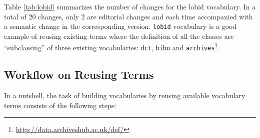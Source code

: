 Table \ref{tab:lobid} summarizes the number of changes for the lobid vocabulary. In  a total of 20 changes, only 2 are editorial changes and each time accompanied with a semantic change in the corresponding version.
\texttt{lobid} vocabulary is a good example of reusing existing terms where the definition of all the classes are ``subclassing'' of three existing vocabularies: \texttt{dct}, \texttt{bibo} and \texttt{archives}\footnote{\url{http://data.archiveshub.ac.uk/def/}}.  

\begin{table}[!htb]
\end{table}

\subsection{Workflow on Reusing Terms}
In a nutshell, the task of building vocabularies by reusing available vocabulary terms consists of the following steps:

